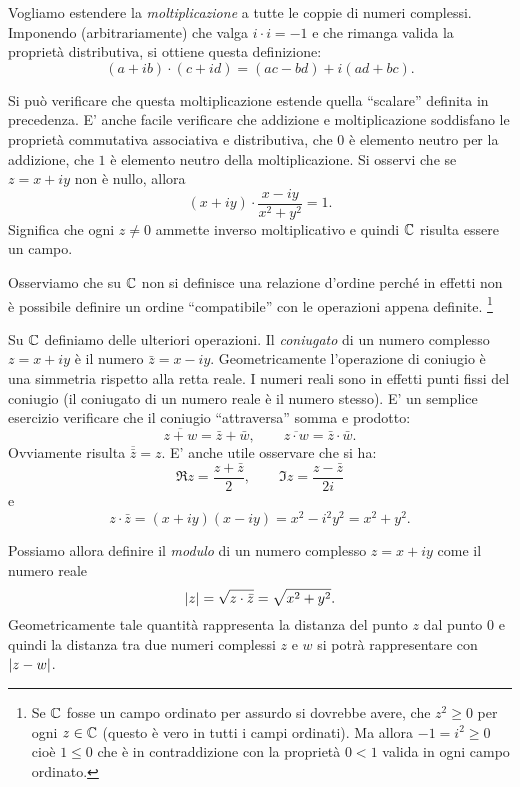 Vogliamo estendere la \emph{moltiplicazione}%
%
 a tutte le coppie di numeri complessi.
Imponendo (arbitrariamente) che valga $i\cdot i = -1$ e che rimanga
valida la proprietà distributiva, si ottiene
questa definizione:
\[
   (a+ib) \cdot (c+id) = (ac-bd) + i(ad+bc).
\]

Si può verificare che questa moltiplicazione estende quella ``scalare'' definita
in precedenza.
E' anche facile verificare che addizione e moltiplicazione soddisfano
le proprietà commutativa associativa e distributiva,
che $0$ è elemento neutro per la addizione, che $1$ è elemento neutro
della moltiplicazione.
Si osservi che se $z=x+iy$ non è nullo, allora
\[
  (x+iy) \cdot \frac{x-iy}{x^2+y^2} = 1.
\]
Significa che ogni $z\neq 0$ ammette inverso moltiplicativo e quindi ${\mathbb C}$
risulta essere un campo.

Osserviamo che su ${\mathbb C}$ non si definisce una relazione d'ordine perché
in effetti non è possibile definire un ordine ``compatibile'' con le operazioni
appena definite.%
\footnote{%
Se ${\mathbb C}$ fosse un campo ordinato per assurdo
si dovrebbe avere,
che $z^2\ge 0$ per ogni $z\in {\mathbb C}$ (questo è vero in tutti i campi ordinati). 
Ma
allora $-1 =i^2 \ge 0$ cioè $1\le 0$ che è in contraddizione
con la proprietà $0<1$ valida in ogni campo ordinato.
} %

Su ${\mathbb C}$ definiamo delle ulteriori operazioni.
Il \emph{coniugato}%
%
%
di un numero complesso $z=x+iy$ è il numero
$\bar z = x - iy$. Geometricamente l'operazione di coniugio è una simmetria
rispetto alla retta reale. I numeri reali sono in effetti punti fissi del
coniugio (il coniugato di un numero reale è il numero stesso).
E' un semplice esercizio verificare che il coniugio ``attraversa''
somma e prodotto:
\[
\overline{z+w} = \bar z + \bar w, \qquad
\overline{z\cdot w} = \bar z \cdot \bar w.
\]
Ovviamente risulta $\overline {\bar z} = z$.
E' anche utile osservare che si ha:
\begin{equation}\label{eq:re_im}
  \Re z = \frac{z+\bar z}{2}, \qquad
  \Im z = \frac{z-\bar z}{2i}
\end{equation}
e
\[
z \cdot \bar z = (x+iy)(x-iy) = x^2-i^2y^2 = x^2+y^2.
\]

Possiamo allora definire il
\emph{modulo}%
%
%
 di un numero complesso $z=x+iy$
come il numero reale
\[
{\left|z\right|} = \sqrt{z\cdot\bar z} = \sqrt{x^2+y^2}.
\]
Geometricamente tale quantità rappresenta la distanza del punto $z$
dal punto $0$ e quindi la distanza tra due numeri complessi $z$ e
$w$ si potrà rappresentare con ${\left|z-w\right|}$.

